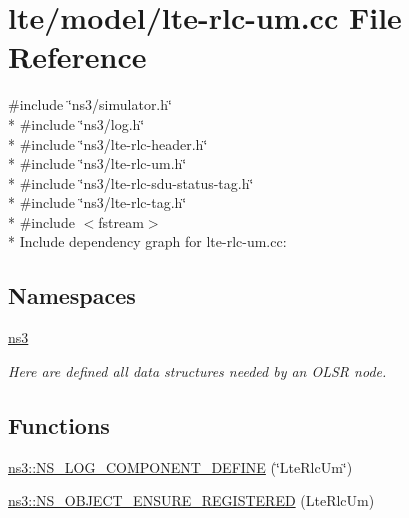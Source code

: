 \hypertarget{lte-rlc-um_8cc}{}\section{lte/model/lte-\/rlc-\/um.cc File Reference}
\label{lte-rlc-um_8cc}
{\ttfamily \#include \char`\"{}ns3/simulator.\+h\char`\"{}}\\*
{\ttfamily \#include \char`\"{}ns3/log.\+h\char`\"{}}\\*
{\ttfamily \#include \char`\"{}ns3/lte-\/rlc-\/header.\+h\char`\"{}}\\*
{\ttfamily \#include \char`\"{}ns3/lte-\/rlc-\/um.\+h\char`\"{}}\\*
{\ttfamily \#include \char`\"{}ns3/lte-\/rlc-\/sdu-\/status-\/tag.\+h\char`\"{}}\\*
{\ttfamily \#include \char`\"{}ns3/lte-\/rlc-\/tag.\+h\char`\"{}}\\*
{\ttfamily \#include $<$fstream$>$}\\*
Include dependency graph for lte-\/rlc-\/um.cc\+:
\subsection*{Namespaces}
\begin{DoxyCompactItemize}
\item 
 \hyperlink{namespacens3}{ns3}
\begin{DoxyCompactList}\small\item\em Here are defined all data structures needed by an O\+L\+SR node. \end{DoxyCompactList}\end{DoxyCompactItemize}
\subsection*{Functions}
\begin{DoxyCompactItemize}
\item 
\hyperlink{namespacens3_a89e92e76bd361eee25a70dc6144a9a75}{ns3\+::\+N\+S\+\_\+\+L\+O\+G\+\_\+\+C\+O\+M\+P\+O\+N\+E\+N\+T\+\_\+\+D\+E\+F\+I\+NE} (\char`\"{}Lte\+Rlc\+Um\char`\"{})
\item 
\hyperlink{namespacens3_a8af817cfabee784cee364e88dce70b67}{ns3\+::\+N\+S\+\_\+\+O\+B\+J\+E\+C\+T\+\_\+\+E\+N\+S\+U\+R\+E\+\_\+\+R\+E\+G\+I\+S\+T\+E\+R\+ED} (Lte\+Rlc\+Um)
\end{DoxyCompactItemize}
